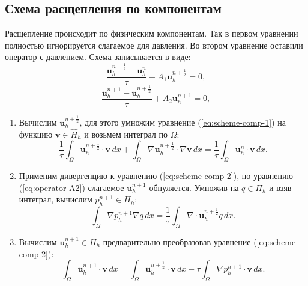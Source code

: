 \documentclass[12pt]{article}
\begin{document}
\subsection{Схема расщепления по компонентам} 
Расщепление происходит по физическим компонентам. Так в первом уравнении полностью игнорируется слагаемое для давления. Во втором уравнение оставили оператор с давлением. Схема записывается в виде:
\begin{equation} \label{eq:scheme-comp-1}
\frac{{\bm u}_h^{n+\frac{1}{2}}-{\bm u}_h^n}{\tau} + A_1 {\bm u}_h^{n+\frac{1}{2}}=0,
\end{equation} 
\begin{equation} \label{eq:scheme-comp-2}
\frac{{\bm u}_h^{n+1}-{\bm u}_h^{n+\frac{1}{2}}}{\tau} + A_2 {\bm u}_h^{n+1}=0,
\end{equation}
\begin{enumerate}
\item 
Вычислим ${\bm u}_h^{n+\frac{1}{2}}$, для этого умножим уравнение (\ref{eq:scheme-comp-1}) на функцию ${\bm v} \in \hat H_h$ и возьмем интеграл по $\Omega$:
$$
\frac{1}{\tau}\int_{\Omega} {\bm u}_h^{n+\frac{1}{2}}\cdot {\bm v} \,dx + \int_{\Omega} \nabla {\bm u}_h^{n+\frac{1}{2}} \cdot \nabla {\bm v} \,dx = \frac{1}{\tau} \int_{\Omega} {\bm u}_h^{n} \cdot {\bm v} \,dx.
$$
\item 
Применим дивергенцию к уравнению (\ref{eq:scheme-comp-2}), по уравнению (\ref{eq:operator-A2}) слагаемое ${\bm u}_h^{n+1}$ обнуляется. Умножив на $q \in \Pi_h$ и взяв интеграл, вычислим $p_h^{n+1} \in \Pi_h$:
$$
\int_{\Omega} \nabla p_h^{n+1} \nabla q \,dx = \frac{1}{\tau} \int_{\Omega} \nabla \cdot {\bm u}_h^{n+\frac{1}{2}} q \,dx.
$$
\item 
Вычислим ${\bm u}_h^{n+1} \in H_h$ предварительно преобразовав уравнение (\ref{eq:scheme-comp-2}):
$$
\int_{\Omega} {\bm u}_h^{n+1} \cdot {\bm v}\,dx = \int_{\Omega} {\bm u}_h^{n+\frac{1}{2}} \cdot {\bm v} \, dx - \tau \int_{\Omega} \nabla p_h^{n+1} \cdot {\bm v} \,dx.
$$
\end{enumerate}
\end{document}
